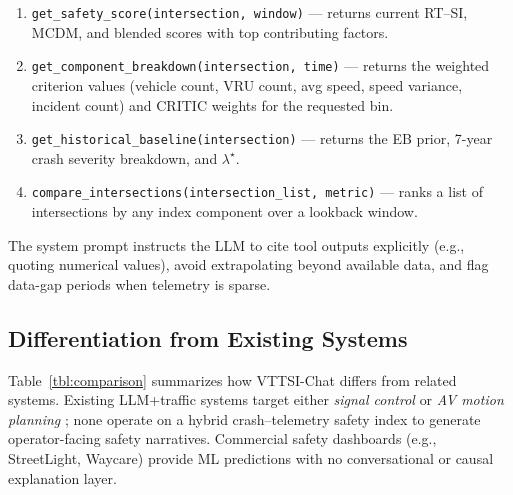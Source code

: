 \documentclass[conference]{IEEEtran}
\begin{document}
\begin{enumerate}
    \item \texttt{get\_safety\_score(intersection, window)} ---
          returns current RT--SI, MCDM, and blended scores with top contributing factors.
    \item \texttt{get\_component\_breakdown(intersection, time)} ---
          returns the weighted criterion values (vehicle count, VRU count, avg speed,
          speed variance, incident count) and CRITIC weights for the requested bin.
    \item \texttt{get\_historical\_baseline(intersection)} ---
          returns the EB prior, 7-year crash severity breakdown, and $\lambda^\star$.
    \item \texttt{compare\_intersections(intersection\_list, metric)} ---
          ranks a list of intersections by any index component over a lookback window.
\end{enumerate}

The system prompt instructs the LLM to cite tool outputs explicitly (e.g., quoting
numerical values), avoid extrapolating beyond available data, and flag data-gap periods
when telemetry is sparse.

\subsection{Differentiation from Existing Systems}

Table~\ref{tbl:comparison} summarizes how VTTSI-Chat differs from related systems.
Existing LLM+traffic systems target either \emph{signal control}
\cite{llmlight2024,trafficgpt2023} or \emph{AV motion planning}
\cite{gptdriver2023,drivevlm2024}; none operate on a hybrid crash--telemetry safety
index to generate operator-facing safety narratives.
Commercial safety dashboards (e.g., StreetLight, Waycare) provide ML predictions with no
conversational or causal explanation layer.
\end{document}
